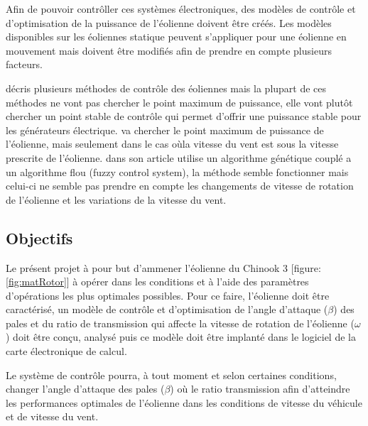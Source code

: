 Afin de pouvoir contrôller ces systèmes électroniques, des modèles de contrôle et d'optimisation de la puissance de l'éolienne doivent être créés. Les modèles disponibles sur les éoliennes statique peuvent s'appliquer pour une éolienne en mouvement mais doivent être modifiés afin de prendre en compte plusieurs facteurs.

\citet{LaksPao} décris plusieurs méthodes de contrôle des éoliennes mais la plupart de ces méthodes ne vont pas chercher le point maximum de puissance, elle vont plutôt chercher un point stable de contrôle qui permet d'offrir une puissance stable pour les générateurs électrique. \citet{Jelavic05} va chercher le point maximum de puissance de l'éolienne, mais seulement dans le cas oùla vitesse du vent est sous la vitesse prescrite de l'éolienne. \citet{Ouissam12} dans son article utilise un algorithme génétique couplé a un algorithme flou (fuzzy control system), la méthode semble fonctionner mais celui-ci ne semble pas prendre en compte les changements de vitesse de rotation de l'éolienne et les variations de la vitesse du vent.

\subsection{Objectifs} %
\label{sub:Objectifs}


Le présent projet à pour but d'ammener l'éolienne du Chinook 3 [figure: \ref{fig:matRotor}] à opérer dans les conditions et à l'aide des paramètres d'opérations les plus optimales possibles. Pour ce faire, l'éolienne doit être caractérisé, un modèle de contrôle et d'optimisation de l'angle d'attaque ($\beta$) des pales et du ratio de transmission qui affecte la vitesse de rotation de l'éolienne ($\omega$) doit être conçu, analysé puis ce modèle doit être implanté dans le logiciel de la carte électronique de calcul.

Le système de contrôle pourra, à tout moment et selon certaines conditions, changer l'angle d'attaque des pales ($\beta$) où le ratio transmission afin d'atteindre les performances optimales de l'éolienne dans les conditions de vitesse du véhicule et de vitesse du vent.

